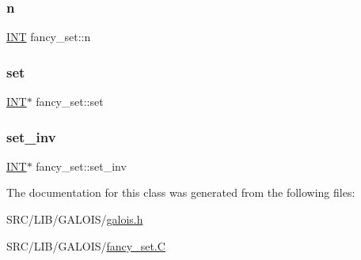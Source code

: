 \mbox{\label{classfancy__set_a25ff45c6332feb9a6a2bff3156b4c814}} 
\subsubsection{\texorpdfstring{n}{n}}
{\footnotesize\ttfamily \mbox{\hyperlink{galois_8h_a09fddde158a3a20bd2dcadb609de11dc}{I\+NT}} fancy\+\_\+set\+::n}

\mbox{\label{classfancy__set_a8618a1f1cfa6d3359134160ddc476f18}} 
\subsubsection{\texorpdfstring{set}{set}}
{\footnotesize\ttfamily \mbox{\hyperlink{galois_8h_a09fddde158a3a20bd2dcadb609de11dc}{I\+NT}}$\ast$ fancy\+\_\+set\+::set}

\mbox{\label{classfancy__set_a9ed73ce5cd821eeb28fac09d9afcd585}} 
\subsubsection{\texorpdfstring{set\+\_\+inv}{set\_inv}}
{\footnotesize\ttfamily \mbox{\hyperlink{galois_8h_a09fddde158a3a20bd2dcadb609de11dc}{I\+NT}}$\ast$ fancy\+\_\+set\+::set\+\_\+inv}



The documentation for this class was generated from the following files\+:\begin{DoxyCompactItemize}
\item 
S\+R\+C/\+L\+I\+B/\+G\+A\+L\+O\+I\+S/\mbox{\hyperlink{galois_8h}{galois.\+h}}\item 
S\+R\+C/\+L\+I\+B/\+G\+A\+L\+O\+I\+S/\mbox{\hyperlink{fancy__set_8_c}{fancy\+\_\+set.\+C}}\end{DoxyCompactItemize}
